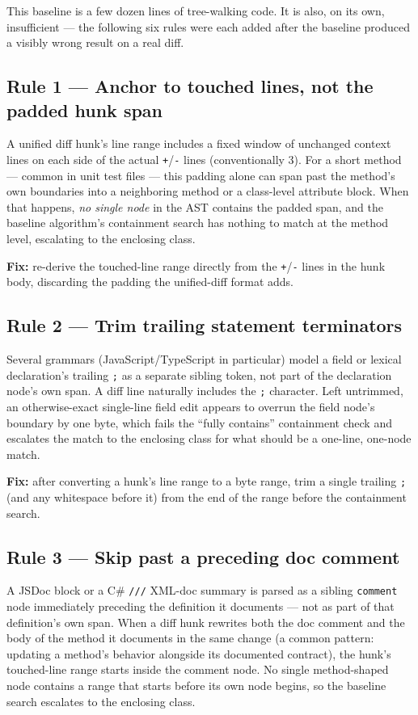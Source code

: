 \documentclass[11pt]{article}
\newcommand{\code}[1]{\texttt{#1}}
\begin{document}
This baseline is a few dozen lines of tree-walking code. It is also, on its own,
insufficient --- the following six rules were each added after the baseline
produced a visibly wrong result on a real diff.

\subsection{Rule 1 --- Anchor to touched lines, not the padded hunk span}

A unified diff hunk's line range includes a fixed window of unchanged context
lines on each side of the actual \code{+}/\code{-} lines (conventionally 3). For a
short method --- common in unit test files --- this padding alone can span past
the method's own boundaries into a neighboring method or a class-level attribute
block. When that happens, \emph{no single node} in the AST contains the padded
span, and the baseline algorithm's containment search has nothing to match at the
method level, escalating to the enclosing class.

\textbf{Fix:} re-derive the touched-line range directly from the \code{+}/\code{-}
lines in the hunk body, discarding the padding the unified-diff format adds.

\subsection{Rule 2 --- Trim trailing statement terminators}

Several grammars (JavaScript/TypeScript in particular) model a field or lexical
declaration's trailing \code{;} as a separate sibling token, not part of the
declaration node's own span. A diff line naturally includes the \code{;}
character. Left untrimmed, an otherwise-exact single-line field edit appears to
overrun the field node's boundary by one byte, which fails the ``fully contains''
containment check and escalates the match to the enclosing class for what should
be a one-line, one-node match.

\textbf{Fix:} after converting a hunk's line range to a byte range, trim a single
trailing \code{;} (and any whitespace before it) from the end of the range before
the containment search.

\subsection{Rule 3 --- Skip past a preceding doc comment}

A JSDoc block or a C\# \code{///} XML-doc summary is parsed as a sibling
\code{comment} node immediately preceding the definition it documents --- not as
part of that definition's own span. When a diff hunk rewrites both the doc comment
and the body of the method it documents in the same change (a common pattern:
updating a method's behavior alongside its documented contract), the hunk's
touched-line range starts inside the comment node. No single method-shaped node
contains a range that starts before its own node begins, so the baseline search
escalates to the enclosing class.
\end{document}

